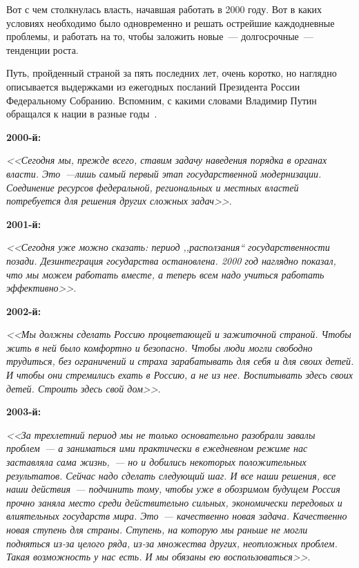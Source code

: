 \documentclass[article, 12pt, russian, oneside]{ncc}
\begin{document}
Вот с чем столкнулась власть, начавшая работать в 2000 году. Вот в
каких условиях необходимо было одновременно и решать острейшие
каждодневные проблемы, и работать на то, чтобы заложить новые~---
долгосрочные~--- тенденции роста.

Путь, пройденный страной за пять последних лет, очень коротко, но
наглядно описывается выдержками из ежегодных посланий Президента
России Федеральному Собранию. Вспомним, с какими словами Владимир
Путин обращался к нации в разные годы~\cite{NPR_Idea}.  \newline

\textbf{2000-й:}

\emph{<<Сегодня мы, прежде всего, ставим задачу наведения порядка в
  органах власти. Это~---лишь самый первый этап государственной
  модернизации. Соединение ресурсов федеральной, региональных и
  местных властей потребуется для решения других сложных
  задач>>}\cite{Putin_2000}.

\textbf{2001-й:}

\emph{<<Сегодня уже можно сказать: период ,,расползания``
  государственности позади. Дезинтеграция государства
  остановлена. 2000 год наглядно показал, что мы можем работать
  вместе, а теперь всем надо учиться работать эффективно>>}\cite{Putin_2001}.

\textbf{2002-й:}

\emph{<<Мы должны сделать Россию процветающей и зажиточной
  страной. Чтобы жить в ней было комфортно и безопасно. Чтобы люди
  могли свободно трудиться, без ограничений и страха зарабатывать для
  себя и для своих детей. И чтобы они стремились ехать в Россию, а не
  из нее. Воспитывать здесь своих детей. Строить здесь свой дом>>}\cite{Putin_2002}.

\textbf{2003-й:}

\emph{<<За трехлетний период мы не только основательно разобрали
  завалы проблем~--- а заниматься ими практически в ежедневном режиме
  нас заставляла сама жизнь,~--- но и добились некоторых положительных
  результатов. Сейчас надо сделать следующий шаг. И все наши решения,
  все наши действия~--- подчинить тому, чтобы уже в обозримом будущем
  Россия прочно заняла место среди действительно сильных, экономически
  передовых и влиятельных государств мира. Это~--- качественно новая
  задача. Качественно новая ступень для страны. Ступень, на которую мы
  раньше не могли подняться из-за целого ряда, из-за множества других,
  неотложных проблем. Такая возможность у нас есть. И мы обязаны ею
  воспользоваться>>}\cite{Putin_2003}.
\end{document}
